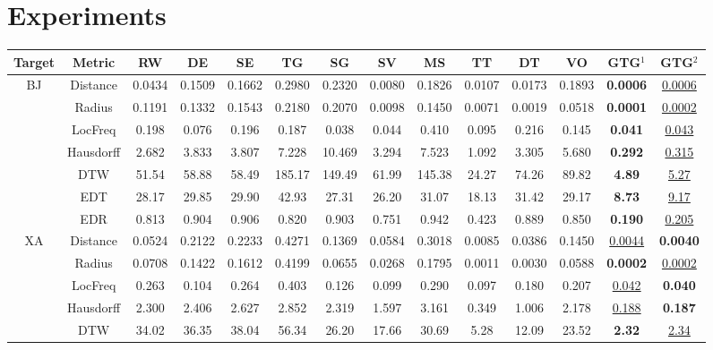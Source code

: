 \section{Experiments}
\begin{table*}[t]
\small
\centering
\fontsize{7}{8}\selectfont
\setlength{\tabcolsep}{8pt}
\begin{tabular}{c|c|cccccccccc|cc}
\toprule
Target & Metric & RW & DE & SE & TG & SG & SV & MS & TT & DT & VO & GTG$^{1}$ & GTG$^{2}$ \\
\midrule
\multirow{7}{*}{BJ} & Distance & 0.0434 & 0.1509 & 0.1662 & 0.2980 & 0.2320 & 0.0080 & 0.1826 & 0.0107 & 0.0173 & 0.1893 & \textbf{0.0006} & \underline{0.0006} \\ 
    & Radius & 0.1191 & 0.1332 & 0.1543 & 0.2180 & 0.2070 & 0.0098 & 0.1450 & 0.0071 & 0.0019 & 0.0518 & \textbf{0.0001} & \underline{0.0002} \\ 
    & LocFreq & 0.198 & 0.076 & 0.196 & 0.187 & 0.038 & 0.044 & 0.410 & 0.095 & 0.216 & 0.145 & \textbf{0.041} & \underline{0.043} \\ 
    & Hausdorff & 2.682 & 3.833 & 3.807 & 7.228 & 10.469 & 3.294 & 7.523 & 1.092 & 3.305 & 5.680 & \textbf{0.292} & \underline{0.315} \\ 
    & DTW & 51.54 & 58.88 & 58.49 & 185.17 & 149.49 & 61.99 & 145.38 & 24.27 & 74.26 & 89.82 & \textbf{4.89} & \underline{5.27} \\ 
    & EDT & 28.17 & 29.85 & 29.90 & 42.93 & 27.31 & 26.20 & 31.07 & 18.13 & 31.42 & 29.17 & \textbf{8.73} & \underline{9.17} \\ 
    & EDR & 0.813 & 0.904 & 0.906 & 0.820 & 0.903 & 0.751 & 0.942 & 0.423 & 0.889 & 0.850 & \textbf{0.190} & \underline{0.205} \\
\midrule
\multirow{7}{*}{XA} & Distance & 0.0524 & 0.2122 & 0.2233 & 0.4271 & 0.1369 & 0.0584 & 0.3018 & 0.0085 & 0.0386 & 0.1450 & \underline{0.0044} & \textbf{0.0040} \\ 
    & Radius & 0.0708 & 0.1422 & 0.1612 & 0.4199 & 0.0655 & 0.0268 & 0.1795 & 0.0011 & 0.0030 & 0.0588 & \textbf{0.0002} & \underline{0.0002} \\ 
    & LocFreq & 0.263 & 0.104 & 0.264 & 0.403 & 0.126 & 0.099 & 0.290 & 0.097 & 0.180 & 0.207 & \underline{0.042} & \textbf{0.040} \\ 
    & Hausdorff & 2.300 & 2.406 & 2.627 & 2.852 & 2.319 & 1.597 & 3.161 & 0.349 & 1.006 & 2.178 & \underline{0.188} & \textbf{0.187} \\ 
    & DTW & 34.02 & 36.35 & 38.04 & 56.34 & 26.20 & 17.66 & 30.69 & 5.28 & 12.09 & 23.52 & \textbf{2.32} & \underline{2.34} \\ 

\end{tabular}
\end{table*}
